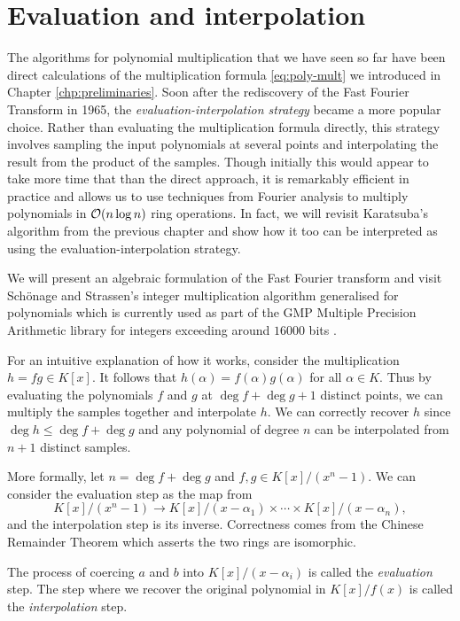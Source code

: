 \chapter{Evaluation and interpolation}\label{chp:eval-interp}

The algorithms for polynomial multiplication that we have seen so far have been direct calculations of the multiplication formula \eqref{eq:poly-mult} we introduced in Chapter \ref{chp:preliminaries}. Soon after the rediscovery of the Fast Fourier Transform in 1965, the \textit{evaluation-interpolation strategy} became a more popular choice. Rather than evaluating the multiplication formula directly, this strategy involves sampling the input polynomials at several points and interpolating the result from the product of the samples. Though initially this would appear to take more time that than the direct approach, it is remarkably efficient in practice and allows us to use techniques from Fourier analysis to multiply polynomials in $\mathcal O(n \log n)$ ring operations. In fact, we will revisit Karatsuba's algorithm from the previous chapter and show how it too can be interpreted as using the evaluation-interpolation strategy.

We will present an algebraic formulation of the Fast Fourier transform and visit Sch\"{o}nage and Strassen's integer multiplication algorithm generalised for polynomials which is currently used as part of the GMP Multiple Precision Arithmetic library for integers exceeding around $16000$ bits \cite{gmp-big-num}.

For an intuitive explanation of how it works, consider the multiplication $h = fg \in K[x]$. It follows that $h(\alpha) = f(\alpha)g(\alpha)$ for all $\alpha \in K$. Thus by evaluating the polynomials $f$ and $g$ at $\deg f + \deg g + 1$ distinct points, we can multiply the samples together and interpolate $h$. We can correctly recover $h$ since $\deg h \le \deg f + \deg g$ and any polynomial of degree $n$ can be interpolated from $n + 1$ distinct samples.

More formally, let $n = \deg f + \deg g$ and $f, g \in K[x]/(x^n - 1)$. We can consider the evaluation step as the map from 
\[
    K[x]/(x^n - 1) \to K[x]/(x - \alpha_1) \times \cdots \times K[x]/(x - \alpha_n),
\]
and the interpolation step is its inverse. Correctness comes from the Chinese Remainder Theorem which asserts the two rings are isomorphic.

The process of coercing $a$ and $b$ into $K[x]/ (x - \alpha_i)$ is called the \emph{evaluation} step. The step where we recover the original polynomial in $K[x]/f(x)$ is called the \emph{interpolation} step.

